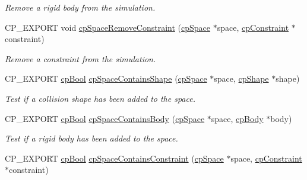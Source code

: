 \begin{DoxyCompactItemize}
\begin{DoxyCompactList}\small\item\em Remove a rigid body from the simulation. \end{DoxyCompactList}\item 
\mbox{\label{group__cp_space_gaeec0e391838c99b4b3cbd49d5f28e609}} 
C\+P\+\_\+\+E\+X\+P\+O\+RT void \mbox{\hyperlink{group__cp_space_gaeec0e391838c99b4b3cbd49d5f28e609}{cp\+Space\+Remove\+Constraint}} (\mbox{\hyperlink{structcp_space}{cp\+Space}} $\ast$space, \mbox{\hyperlink{structcp_constraint}{cp\+Constraint}} $\ast$constraint)
\begin{DoxyCompactList}\small\item\em Remove a constraint from the simulation. \end{DoxyCompactList}\item 
\mbox{\label{group__cp_space_ga1c3d88fb51ede38bc5e84f31518d0a83}} 
C\+P\+\_\+\+E\+X\+P\+O\+RT \mbox{\hyperlink{group__basic_types_gabc5e752c48f3449ca26ef413ecbd647e}{cp\+Bool}} \mbox{\hyperlink{group__cp_space_ga1c3d88fb51ede38bc5e84f31518d0a83}{cp\+Space\+Contains\+Shape}} (\mbox{\hyperlink{structcp_space}{cp\+Space}} $\ast$space, \mbox{\hyperlink{structcp_shape}{cp\+Shape}} $\ast$shape)
\begin{DoxyCompactList}\small\item\em Test if a collision shape has been added to the space. \end{DoxyCompactList}\item 
\mbox{\label{group__cp_space_ga7d240d6dd4742b465590f60909681862}} 
C\+P\+\_\+\+E\+X\+P\+O\+RT \mbox{\hyperlink{group__basic_types_gabc5e752c48f3449ca26ef413ecbd647e}{cp\+Bool}} \mbox{\hyperlink{group__cp_space_ga7d240d6dd4742b465590f60909681862}{cp\+Space\+Contains\+Body}} (\mbox{\hyperlink{structcp_space}{cp\+Space}} $\ast$space, \mbox{\hyperlink{structcp_body}{cp\+Body}} $\ast$body)
\begin{DoxyCompactList}\small\item\em Test if a rigid body has been added to the space. \end{DoxyCompactList}\item 
\mbox{\label{group__cp_space_gaf49f0495a0e0fda2dc76ae66c3bc637a}} 
C\+P\+\_\+\+E\+X\+P\+O\+RT \mbox{\hyperlink{group__basic_types_gabc5e752c48f3449ca26ef413ecbd647e}{cp\+Bool}} \mbox{\hyperlink{group__cp_space_gaf49f0495a0e0fda2dc76ae66c3bc637a}{cp\+Space\+Contains\+Constraint}} (\mbox{\hyperlink{structcp_space}{cp\+Space}} $\ast$space, \mbox{\hyperlink{structcp_constraint}{cp\+Constraint}} $\ast$constraint)

\end{DoxyCompactItemize}
